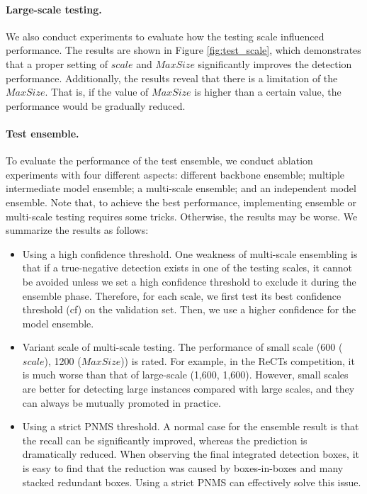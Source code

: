 \paragraph{Large-scale testing.} We also conduct  experiments to evaluate how the testing scale influenced performance. The results are shown in Figure \ref{fig:test_scale}, which demonstrates that a proper setting of $scale$ and $MaxSize$ significantly improves the detection performance. Additionally, the results reveal that there is a limitation of the $MaxSize$. That is, if the value of $MaxSize$ is higher than a certain value, the performance would be gradually reduced.




\paragraph{Test ensemble.} To evaluate the performance of the test ensemble, we conduct ablation experiments with four different aspects: different backbone ensemble; multiple intermediate model ensemble; a multi-scale ensemble; and an independent model ensemble. Note that, to achieve the best performance, implementing ensemble or multi-scale testing requires some tricks. Otherwise, the results may be worse. We summarize the results as follows: 
\begin{itemize}
  \item Using a high confidence threshold. One weakness of multi-scale ensembling is that if a true-negative detection exists in one of the testing scales, it cannot be avoided unless we set a high confidence threshold to exclude it during the ensemble phase. Therefore, for each scale, we first test its best confidence threshold (cf) on the validation set. Then, we use a higher confidence for the model ensemble.
  \item Variant scale of multi-scale testing. The performance of small scale (600 ($scale$), 1200 ($MaxSize$)) is rated. For example, in the ReCTs competition, it is much worse than that of large-scale (1,600, 1,600). However, small scales are better for
  detecting large instances compared with large scales, and they can always be mutually promoted in practice.
  \item Using a strict PNMS threshold. A normal case for the ensemble result is that the recall can be significantly improved, whereas the prediction is dramatically reduced. When observing the final integrated detection boxes, it is easy to find that the reduction was caused by boxes-in-boxes and many stacked redundant boxes. Using a strict PNMS can effectively solve this issue.
\end{itemize}



